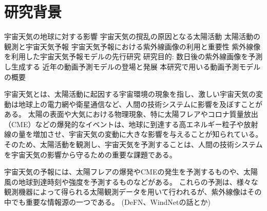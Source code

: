 \chapter{研究背景}

 宇宙天気の地球に対する影響
 宇宙天気の撹乱の原因となる太陽活動
 太陽活動の観測と宇宙天気予報
 宇宙天気予報における紫外線画像の利用と重要性
 紫外線像を利用した宇宙天気予報モデルの先行研究
 研究目的: 数日後の紫外線画像を予測し生成する
 近年の動画予測モデルの登場と発展
 本研究で用いる動画予測モデルの概要

宇宙天気とは、太陽活動に起因する宇宙環境の現象を指し、激しい宇宙天気の変動は地球上の電力網や衛星通信など、人間の技術システムに影響を及ぼすことがある。
太陽の表面や大気における物理現象、特に太陽フレアやコロナ質量放出（CME）などの爆発的なイベントは、地球に到達する高エネルギー粒子や放射線の量を増加させ、宇宙天気の変動に大きな影響を与えることが知られている。
そのため、太陽活動を観測し、宇宙天気を予測することは、人間の技術システムを宇宙天気の影響から守るための重要な課題である。

宇宙天気の予報には、太陽フレアの爆発やCMEの発生を予測するものや、太陽風の地球到達時刻や強度を予測するものなどがある。
これらの予測は、様々な観測機器によって得られる太陽観測データを用いて行われるが、紫外線像はその中でも重要な情報源の一つである。
(DeFN、WindNetの話とか)